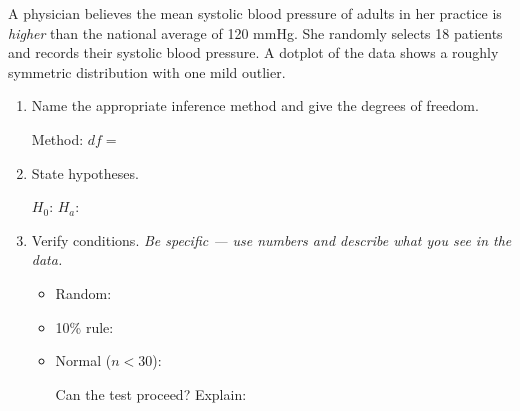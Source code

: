 \documentclass[10pt]{article}
\begin{document}
\namedateperiod

\vspace{0.15in}

A physician believes the mean systolic blood pressure of adults in her practice is
\emph{higher} than the national average of 120 mmHg. She randomly selects 18 patients
and records their systolic blood pressure. A dotplot of the data shows a roughly symmetric
distribution with one mild outlier.

\begin{enumerate}
  \item Name the appropriate inference method and give the degrees of freedom.

        Method:  \quad $df = $ 

  \item State hypotheses.

        $H_0$:  \quad $H_a$: 

  \item Verify conditions. \textit{Be specific --- use numbers and describe what you see in the data.}
        \begin{itemize}
          \item Random: 
          \item 10\% rule: 
          \item Normal ($n < 30$): 

                Can the test proceed?  \quad Explain: 
        \end{itemize}
\end{enumerate}
\end{document}
